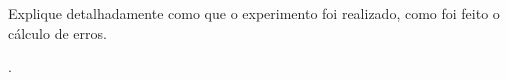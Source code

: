 Explique detalhadamente como que o experimento foi realizado, como foi feito o cálculo de erros. 

\lipsum[7] \cite{livro2}.
